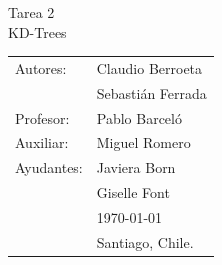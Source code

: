 \documentclass[12pt,letterpaper, margin = 3cm]{article}
\begin{document}
\newpage
\pagestyle{fancy}
\fancyhf{}
\vspace*{5cm}
\begin{center}
\huge  {Tarea 2}\\
\Huge {KD-Trees}\\
\vspace{6cm}
\end{center}
\vfill
\begin{flushright}
\begin{tabular}{ll}
Autores: & Claudio Berroeta\\
& Sebastián Ferrada \\
Profesor: & Pablo Barceló\\
Auxiliar: & Miguel Romero\\
Ayudantes: & Javiera Born\\
& Giselle Font\\
& \today\\
& Santiago, Chile.
\end{tabular}
\end{flushright}

\newpage
\pagestyle{fancy}
\fancyhf{}

\fancyhead[R]{\small \rm \textbf{\thepage}} %



\renewcommand{\sectionmark}[1]{\markright{\thesection.\ #1}}
\renewcommand{\headrulewidth}{0.5pt}
\renewcommand{\footrulewidth}{0.5pt}
\newcommand{\fancyfootnotetext}[2]{%
  \fancypagestyle{dingens}{%
    \fancyfoot[LO,RE]{\parbox{12cm}{\footnotemark[#1]\footnotesize #2}}%
  }%
  \thispagestyle{dingens}%
}
\end{document}
